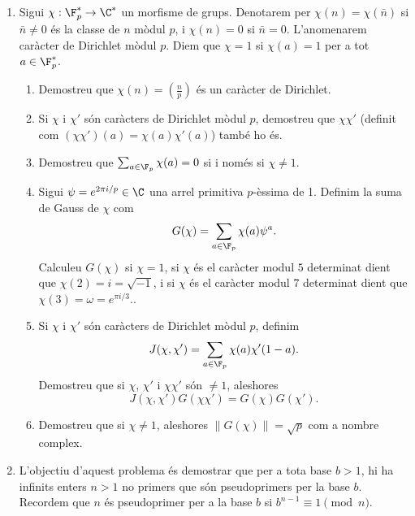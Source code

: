\begin{enumerate}[leftmargin=*]
\item Sigui $\chi:\F_p^* \to \C^*$ un morfisme de grups.
Denotarem per $\chi(n)=\chi(\bar n)$ si $\bar n\ne 0$ és la classe
de $n$ mòdul $p$, i $\chi(n)=0$ si $\bar n=0$. L'anomenarem caràcter
de Dirichlet mòdul $p$. Diem que $\chi=1$ si $\chi(a)=1$ per a tot
$a\in \F_p^*$.

\begin{enumerate}


\item  Demostreu que $\chi(n)=\left( \frac np \right)$ és
un caràcter de Dirichlet.

\item   Si $\chi$ i $\chi'$ són caràcters de Dirichlet
mòdul $p$, demostreu que $\chi\chi'$ (definit com $(\chi\chi')(a)=
\chi(a)\chi'(a)$) també ho és.

\item  Demostreu que $\sum_{a\in \F_p} \chi(a)=0$ si i
només si $\chi\ne 1$.

\item Sigui $\psi=e^{2\pi i/p}\in \C$ una arrel primitiva
$p$-\`{e}ssima de 1. Definim la suma de Gauss de $\chi$ com
$$G(\chi)=\sum_{a\in \F_p} \chi(a) \psi^a.$$
Calculeu $G(\chi)$ si $\chi=1$, si $\chi$ és el caràcter
modul $5$ determinat dient que $\chi(2)=i=\sqrt{-1}$, i si $\chi$
és el caràcter modul $7$ determinat dient que
$\chi(3)=\omega = e^{\pi i /3}.$.

\item  Si $\chi$ i $\chi'$ són caràcters de Dirichlet
mòdul $p$, definim $$J(\chi,\chi')=\sum_{a\in \F_p}
\chi(a)\chi'(1-a).$$ Demostreu que si $\chi$, $\chi'$ i $\chi\chi'$
són $\ne 1$, aleshores
$$J(\chi,\chi')G(\chi\chi')=G(\chi)G(\chi').$$

\item Demostreu que si $\chi\ne 1$, aleshores $\| G(\chi)\|
=\sqrt{p}$ com a nombre complex.

\end{enumerate}



\item L'objectiu d'aquest problema és demostrar que per a
tota base $b>1$, hi ha infinits enters $n>1$ no primers que són
pseudoprimers per la base $b$. Recordem que $n$ és pseudoprimer per
a la base $b$ si $b^{n-1}\equiv 1 \pmod{n}$.


\end{enumerate}

